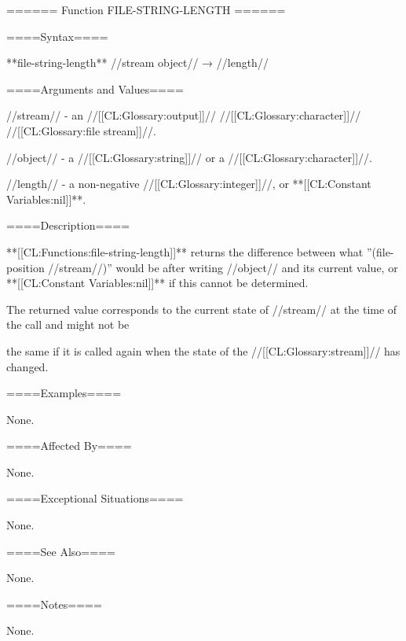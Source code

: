 ====== Function FILE-STRING-LENGTH ======

====Syntax====

**file-string-length** //stream object// → //length//

====Arguments and Values====

//stream// - an //[[CL:Glossary:output]]// //[[CL:Glossary:character]]// //[[CL:Glossary:file stream]]//.

//object// - a //[[CL:Glossary:string]]// or a //[[CL:Glossary:character]]//.

//length// - a non-negative //[[CL:Glossary:integer]]//, or **[[CL:Constant Variables:nil]]**.

====Description====

**[[CL:Functions:file-string-length]]** returns the difference between what ''(file-position //stream//)'' would be after writing //object// and its current value, or **[[CL:Constant Variables:nil]]** if this cannot be determined.

The returned value corresponds to the current state of //stream// at the time of the call and might not be

the same if it is called again when the state of the //[[CL:Glossary:stream]]// has changed.

====Examples====

None.

====Affected By====

None.

====Exceptional Situations====

None.

====See Also====

None.

====Notes====

None.

